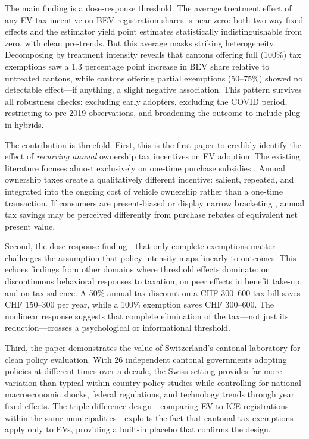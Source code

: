 \documentclass[12pt]{article}
\begin{document}
The main finding is a dose-response threshold. The average treatment effect of any EV tax incentive on BEV registration shares is near zero: both two-way fixed effects and the \citet{callaway2021difference} estimator yield point estimates statistically indistinguishable from zero, with clean pre-trends. But this average masks striking heterogeneity. Decomposing by treatment intensity reveals that cantons offering full (100\%) tax exemptions saw a 1.3 percentage point increase in BEV share relative to untreated cantons, while cantons offering partial exemptions (50--75\%) showed no detectable effect---if anything, a slight negative association. This pattern survives all robustness checks: excluding early adopters, excluding the COVID period, restricting to pre-2019 observations, and broadening the outcome to include plug-in hybrids.

The contribution is threefold. First, this is the first paper to credibly identify the effect of \textit{recurring annual} ownership tax incentives on EV adoption. The existing literature focuses almost exclusively on one-time purchase subsidies \citep{sallee2011value, clinton2019providing, muehlegger2022economics, li2017market, springel2021network, beresteanu2011gasoline, gallagher2014learning}. Annual ownership taxes create a qualitatively different incentive: salient, repeated, and integrated into the ongoing cost of vehicle ownership rather than a one-time transaction. If consumers are present-biased or display narrow bracketing \citep{thaler1999mental, ericson2017money}, annual tax savings may be perceived differently from purchase rebates of equivalent net present value.

Second, the dose-response finding---that only complete exemptions matter---challenges the assumption that policy intensity maps linearly to outcomes. This echoes findings from other domains where threshold effects dominate: \citet{kleven2011transfer} on discontinuous behavioral responses to taxation, \citet{dahl2014peer} on peer effects in benefit take-up, and \citet{chetty2009salience} on tax salience. A 50\% annual tax discount on a CHF 300--600 tax bill saves CHF 150--300 per year, while a 100\% exemption saves CHF 300--600. The nonlinear response suggests that complete elimination of the tax---not just its reduction---crosses a psychological or informational threshold.

Third, the paper demonstrates the value of Switzerland's cantonal laboratory for clean policy evaluation. With 26 independent cantonal governments adopting policies at different times over a decade, the Swiss setting provides far more variation than typical within-country policy studies while controlling for national macroeconomic shocks, federal regulations, and technology trends through year fixed effects. The triple-difference design---comparing EV to ICE registrations within the same municipalities---exploits the fact that cantonal tax exemptions apply only to EVs, providing a built-in placebo that confirms the design.
\end{document}
